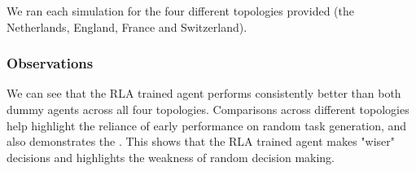 \documentclass[11pt]{article}
\begin{document}
We ran each simulation for the four different topologies provided (the Netherlands, England, France and Switzerland).\\

\subsubsection{Observations}
We can see that the RLA trained agent performs consistently better than both dummy agents across all four topologies. Comparisons across different topologies help highlight the reliance of early performance on random task generation, and also demonstrates the . This shows that the RLA trained agent makes "wiser" decisions and highlights the weakness of random decision making.\\
\end{document}
